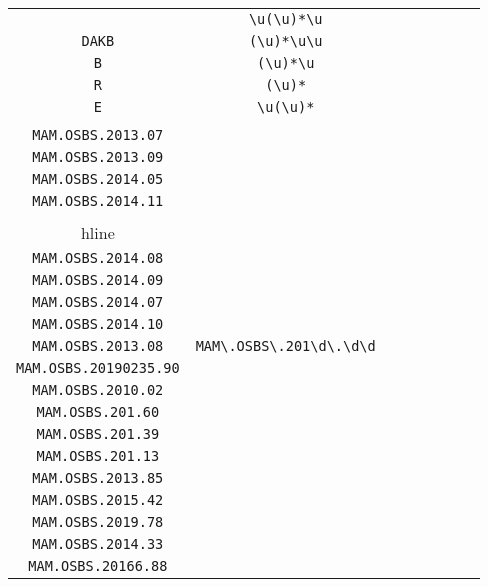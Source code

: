 \begin{longtable}{cccccccc}
\begin{tabular}{ll}
    \verb|PU| & \verb|\u(\u)*\u|\\
\verb|DAKB| & \verb|(\u)*\u\u|\\
\verb|B| & \verb|(\u)*\u|\\
\verb|R| & \verb|(\u)*|\\
\verb|E| & \verb|\u(\u)*|
\end{tabular}
\\\midrule 
\begin{tabular}{l}
    \verb|MAM.OSBS.2014.06|\\
\verb|MAM.OSBS.2013.07|\\
\verb|MAM.OSBS.2013.09|\\
\verb|MAM.OSBS.2014.05|\\
\verb|MAM.OSBS.2014.11|\\
\\hline\\
\verb|MAM.OSBS.2014.08|\\
\verb|MAM.OSBS.2014.09|\\
\verb|MAM.OSBS.2014.07|\\
\verb|MAM.OSBS.2014.10|\\
\verb|MAM.OSBS.2013.08|
\end{tabular}

&
\verb|MAM\.OSBS\.201\d\.\d\d|
&

\begin{tabular}{l}
    \verb|MAM\.OSBS\.201(\d)*\.\d\d|\\
\verb|MAM.OSBS.20190235.90|\\
\verb|MAM.OSBS.2010.02|\\
\verb|MAM.OSBS.201.60|\\
\verb|MAM.OSBS.201.39|\\
\verb|MAM.OSBS.201.13|
\end{tabular}

&

\begin{tabular}{l}
    \verb|MAM\.OSBS\.201\d(\d)*\.\d\d|\\
\verb|MAM.OSBS.2013.85|\\
\verb|MAM.OSBS.2015.42|\\
\verb|MAM.OSBS.2019.78|\\
\verb|MAM.OSBS.2014.33|\\
\verb|MAM.OSBS.20166.88|
\end{tabular}

&


\end{longtable}
